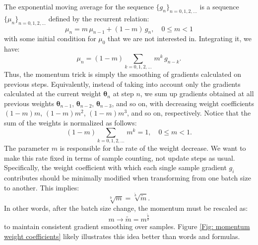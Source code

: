 \documentclass[12pt,a4paper]{amsart}
\numberwithin{equation}{section}
\theoremstyle{remark}
\begin{document}
The exponential moving average for the sequence
$\{g_n\}_{n=0,1,2,\dotso}$
is a sequence
$\{\mu_n\}_{n=0,1,2,\dotso}$
defined by the recurrent relation:
\begin{equation}
	\mu_n = m\, \mu_{n-1} + (1 - m)\, g_n, \quad 0 \leq m < 1
\end{equation}
with some initial condition for
$\mu_0$
that we are not interested in.
Integrating it, we have:
\begin{equation}
	\mu_n = (1 - m)\sum_{k=0,1,2,\dotso} \, m^k\, g_{n-k}.
\end{equation}
Thus, the momentum trick is simply the smoothing of gradients calculated on previous steps.
Equivalently, instead of taking into account only the gradients calculated at the current weight
$\boldsymbol\theta_n$
at step
$n$,
we sum up gradients obtained at all previous weights
$\boldsymbol\theta_{n-1}$,
$\boldsymbol\theta_{n-2}$,
$\boldsymbol\theta_{n-3}$,
and so on, with decreasing weight coefficients
$(1-m)m$,
$(1-m)m^2$,
$(1-m)m^3$,
and so on, respectively.
Notice that the sum of the weights is normalized as follows:
\begin{equation}
	(1-m)\sum_{k=0,1,2,\dotso} \, m^k = 1, \quad 0 \leq m < 1.
\end{equation}
The parameter
$m$
is responsible for the rate of the weight decrease.
We want to make this rate fixed in terms of sample counting,
not update steps as usual.
Specifically, the weight coefficient with which each single sample gradient
$g_i$
contributes should be minimally modified when transforming from one batch size to another.
This implies:
\begin{equation}
	\sqrt[b]{m} = \sqrt[\tilde b]{\tilde m}.
	\label{Formula: m^1/b = m^1/b}
\end{equation}
In other words, after the batch size change, the momentum must be rescaled as:
\begin{equation}
	m \rightarrow \tilde m = m^{\frac{\tilde b}{b}}
	\label{Formula: m->m^b/b}
\end{equation}
to maintain consistent gradient smoothing over samples.
Figure
\ref{Fig: momentum weight coefficients}
likely illustrates this idea better than words and formulas.
\end{document}
